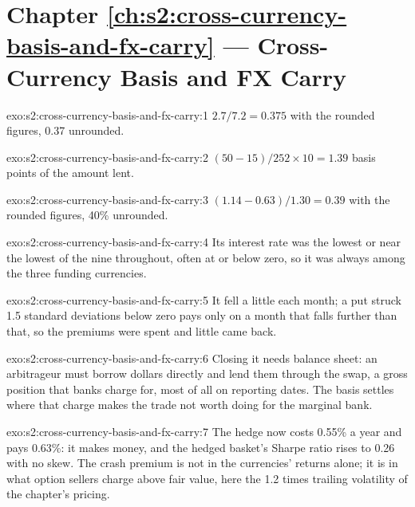 \section*{Chapter \ref{ch:s2:cross-currency-basis-and-fx-carry} --- Cross-Currency Basis and FX Carry}

\begin{solution}{exo:s2:cross-currency-basis-and-fx-carry:1}
$2.7/7.2 = 0.375$ with the rounded figures, 0.37 unrounded.
\end{solution}

\begin{solution}{exo:s2:cross-currency-basis-and-fx-carry:2}
$(50 - 15)/252 \times 10 = 1.39$ basis points of the amount lent.
\end{solution}

\begin{solution}{exo:s2:cross-currency-basis-and-fx-carry:3}
$(1.14 - 0.63)/1.30 = 0.39$ with the rounded figures, 40\% unrounded.
\end{solution}

\begin{solution}{exo:s2:cross-currency-basis-and-fx-carry:4}
Its interest rate was the lowest or near the lowest of the nine throughout, often at or below zero, so it was always among the three funding
currencies.
\end{solution}

\begin{solution}{exo:s2:cross-currency-basis-and-fx-carry:5}
It fell a little each month; a put struck 1.5 standard deviations below zero pays only on a month that falls further than that, so the premiums were
spent and little came back.
\end{solution}

\begin{solution}{exo:s2:cross-currency-basis-and-fx-carry:6}
Closing it needs balance sheet: an arbitrageur must borrow dollars directly and lend them through the swap, a gross position that banks charge for,
most of all on reporting dates. The basis settles where that charge makes the trade not worth doing for the marginal bank.
\end{solution}

\begin{solution}{exo:s2:cross-currency-basis-and-fx-carry:7}
The hedge now costs 0.55\% a year and pays 0.63\%: it makes money, and the hedged basket's Sharpe ratio rises to 0.26 with no skew. The crash premium
is not in the currencies' returns alone; it is in what option sellers charge above fair value, here the 1.2 times trailing volatility of the chapter's
pricing.
\end{solution}

